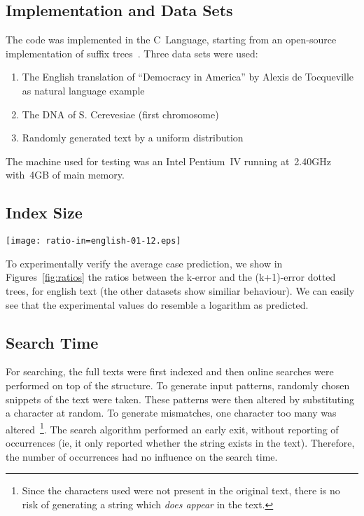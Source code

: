 \subsection{Implementation and Data Sets}

The code was implemented in the C~Language, starting from an open-source implementation of suffix trees~\cite{ansicimplementation}. Three data sets were used:

\begin{enumerate}
\item The English translation of ``Democracy in America'' by Alexis de Tocqueville as natural language example
\item The DNA of S. Cerevesiae (first chromosome)
\item Randomly generated text by a uniform distribution
\end{enumerate}

The machine used for testing was an Intel Pentium~IV running at~2.40GHz with~4GB of main memory.

\subsection{Index Size}

\begin{figure*}%
\centering
\texttt{[image: ratio-in=english-01-12.eps]}%
\caption{Ratio of number of nodes in k-error and (k+1)-error dotted trees}\label{fig:ratios}%
\end{figure*}

To experimentally verify the average case prediction, we show in Figures~\ref{fig:ratios} the ratios between the k-error and the (k+1)-error dotted trees, for english text (the other datasets show similiar behaviour). We can easily see that the experimental values do resemble a logarithm as predicted.

\subsection{Search Time}

For searching, the full texts were first indexed and then online searches were performed on top of the structure. To generate input patterns, randomly chosen snippets of the text were taken. These patterns were then altered by substituting a character at random. To generate mismatches, one character too many was altered~\footnote{Since the characters used were not present in the original text, there is no risk of generating a string which \emph{does appear} in the text.}. The search algorithm performed an early exit, without reporting of occurrences (ie, it only reported whether the string exists in the text). Therefore, the number of occurrences had no influence on the search time.

